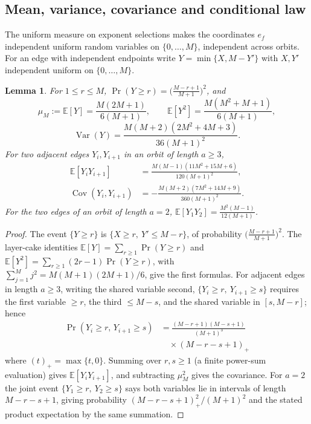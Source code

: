 \documentclass[preprint,12pt,a4paper]{elsarticle}
\newtheorem{lemma}[theorem]{Lemma}
\theoremstyle{definition}
\theoremstyle{remark}
\begin{document}
\subsection{Mean, variance, covariance and conditional law}
\label{sec:moments}

The uniform measure on exponent selections makes the coordinates $e_f$
independent uniform random variables on $\{0,\ldots,M\}$, independent across
orbits.  For an edge with independent endpoints write
$Y=\min\{X,M-Y'\}$ with $X,Y'$ independent uniform on $\{0,\ldots,M\}$.

\begin{lemma}\label{lem:edge-moments}
For $1\leq r\leq M$,
$\Pr(Y\geq r)=\bigl(\frac{M-r+1}{M+1}\bigr)^2$, and
{\small
\[
\mu_M:=\mathbb{E}[Y]=\frac{M(2M+1)}{6(M+1)},\qquad
\mathbb{E}[Y^2]=\frac{M(M^2+M+1)}{6(M+1)},
\]
}
\[
\operatorname{Var}(Y)
 =\frac{M(M+2)(2M^2+4M+3)}{36(M+1)^2}.
\]
For two adjacent edges $Y_i,Y_{i+1}$ in an orbit of length $a\geq3$,
\begin{align*}
\mathbb{E}[Y_iY_{i+1}]
 &=\frac{M(M-1)(11M^2+15M+6)}{120(M+1)^2},\\
\operatorname{Cov}(Y_i,Y_{i+1})
 &=-\frac{M(M+2)(7M^2+14M+9)}{360(M+1)^2}.
\end{align*}
For the two edges of an orbit of length $a=2$,
$\mathbb{E}[Y_1Y_2]=\frac{M^2(M-1)}{12(M+1)}$.
\end{lemma}

\begin{proof}
The event $\{Y\geq r\}$ is $\{X\geq r,\ Y'\leq M-r\}$, of probability
$\bigl(\frac{M-r+1}{M+1}\bigr)^2$.  The layer-cake identities
$\mathbb{E}[Y]=\sum_{r\geq1}\Pr(Y\geq r)$ and
$\mathbb{E}[Y^2]=\sum_{r\geq1}(2r-1)\Pr(Y\geq r)$, with
$\sum_{j=1}^{M}j^2=M(M+1)(2M+1)/6$, give the first formulas.
For adjacent edges in length $a\geq3$, writing the shared variable second,
$\{Y_i\geq r,\ Y_{i+1}\geq s\}$ requires the first variable $\geq r$, the
third $\leq M-s$, and the shared variable in $[s,M-r]$; hence
\[
\begin{aligned}
\Pr(Y_i\geq r,\,Y_{i+1}\geq s)
&=\frac{(M-r+1)(M-s+1)}
{(M+1)^3}\\
&\quad\times (M-r-s+1)_+
\end{aligned}
\]
where $(t)_+=\max\{t,0\}$.  Summing over $r,s\geq1$ (a finite power-sum
evaluation) gives $\mathbb{E}[Y_iY_{i+1}]$, and subtracting $\mu_M^2$ gives
the covariance.  For $a=2$ the joint event
$\{Y_1\geq r,\ Y_2\geq s\}$ says both variables lie in intervals of length
$M-r-s+1$, giving probability $(M-r-s+1)_+^2/(M+1)^2$ and the stated product
expectation by the same summation.
\end{proof}
\end{document}
